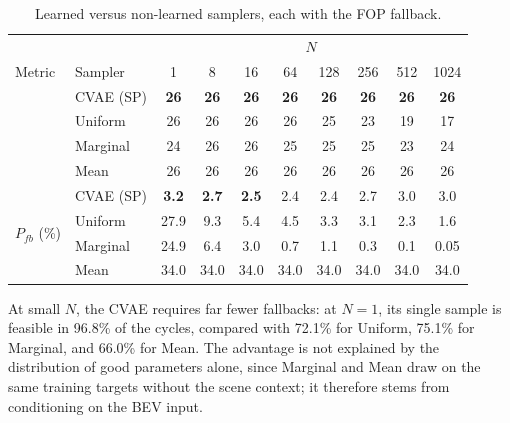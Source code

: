 \begin{table}[t]
\caption{Learned versus non-learned samplers, each with the FOP fallback.}
\label{tab:ablation}
\centering
\scriptsize
\setlength{\tabcolsep}{2.6pt}
\renewcommand{\arraystretch}{1.1}
\begin{tabular}{llcccccccc}
\toprule
& &  \\
\cmidrule(lr){3-10}
Metric & Sampler & 1 & 8 & 16 & 64 & 128 & 256 & 512 & 1024 \\
\midrule
{}
& CVAE (SP) & \textbf{26} & \textbf{26} & \textbf{26} & \textbf{26} & \textbf{26} & \textbf{26} & \textbf{26} & \textbf{26} \\
& Uniform   & 26 & 26 & 26 & 26 & 25 & 23 & 19 & 17 \\
& Marginal  & 24 & 26 & 26 & 25 & 25 & 25 & 23 & 24 \\
& Mean      & 26 & 26 & 26 & 26 & 26 & 26 & 26 & 26 \\
\midrule
{}
& CVAE (SP) & \textbf{3.2} & \textbf{2.7} & \textbf{2.5} & 2.4 & 2.4 & 2.7 & 3.0 & 3.0 \\
& Uniform   & 27.9 & 9.3 & 5.4 & 4.5 & 3.3 & 3.1 & 2.3 & 1.6 \\
& Marginal  & 24.9 & 6.4 & 3.0 & 0.7 & 1.1 & 0.3 & 0.1 & 0.05 \\
& Mean      & 34.0 & 34.0 & 34.0 & 34.0 & 34.0 & 34.0 & 34.0 & 34.0 \\
\bottomrule
\end{tabular}
\end{table}

At small $N$, the CVAE requires far fewer fallbacks: at $N=1$, its single sample is feasible in 96.8\% of the cycles, compared with 72.1\% for Uniform, 75.1\% for Marginal, and 66.0\% for Mean.
The advantage is not explained by the distribution of good parameters alone, since Marginal and Mean draw on the same training targets without the scene context; it therefore stems from conditioning on the BEV input.

